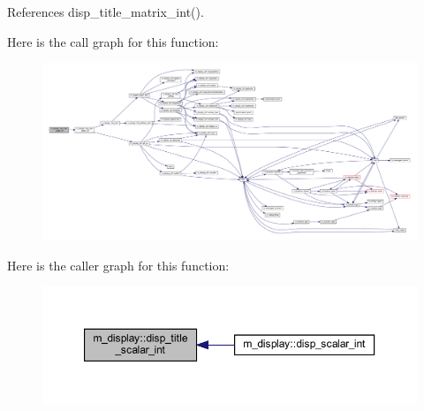 References disp\+\_\+title\+\_\+matrix\+\_\+int().

Here is the call graph for this function\+:
\nopagebreak
\begin{figure}[H]
\begin{center}
\leavevmode
\includegraphics[width=350pt]{namespacem__display_afaae34a88f7f2d5799469f0a6214e0b2_cgraph}
\end{center}
\end{figure}
Here is the caller graph for this function\+:
\nopagebreak
\begin{figure}[H]
\begin{center}
\leavevmode
\includegraphics[width=350pt]{namespacem__display_afaae34a88f7f2d5799469f0a6214e0b2_icgraph}
\end{center}
\end{figure}
\mbox{\label{namespacem__display_a8393f81379778fc9d955bf1e0961aee1}} 
